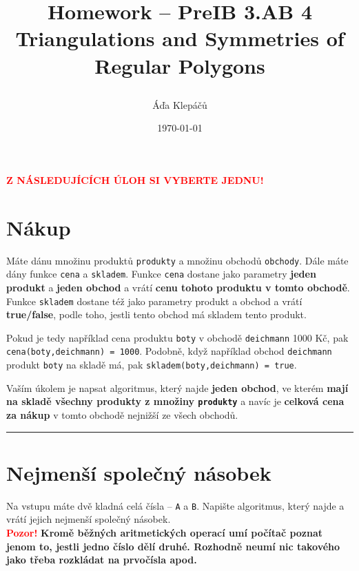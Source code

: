 \documentclass[a4paper,11pt]{article}
\title{\Huge\textsf{Homework -- PreIB 3.AB 4}\\
 \Large\textsf{Triangulations and Symmetries of Regular Polygons}
 \author{Áďa Klepáčů}
 \date{\today}
}
\newcommand{\clr}{\textcolor{red}}
\begin{document}
\thispagestyle{fancy}

\clr{\textbf{\uppercase{Z následujících úloh si vyberte jednu!}}}

\section*{Nákup}
Máte dánu množinu produktů \texttt{produkty} a množinu obchodů \texttt{obchody}.
Dále máte dány funkce \texttt{cena} a \texttt{skladem}. Funkce \texttt{cena}
dostane jako parametry \textbf{jeden produkt} a \textbf{jeden obchod} a vrátí
\textbf{cenu tohoto produktu v tomto obchodě}. Funkce \texttt{skladem} dostane
též jako parametry produkt a obchod a vrátí \textbf{true/false}, podle toho,
jestli tento obchod má skladem tento produkt.

Pokud je tedy například cena produktu \texttt{boty} v obchodě \texttt{deichmann}
1000 Kč, pak \texttt{cena(boty,deichmann) = 1000}. Podobně, když například
obchod \texttt{deichmann} produkt \texttt{boty} na skladě má, pak
\texttt{skladem(boty,deichmann) = true}.

Vaším úkolem je napsat algoritmus, který najde \textbf{jeden obchod}, ve kterém
\textbf{mají na skladě všechny produkty z množiny \texttt{produkty}} a navíc je
\textbf{celková cena za nákup} v tomto obchodě nejnižší ze všech obchodů.

\vspace*{2em}

\hrule

\section*{Nejmenší společný násobek}
Na vstupu máte dvě kladná celá čísla -- \texttt{A} a \texttt{B}. Napište
algoritmus, který najde a vrátí jejich nejmenší společný násobek.\\
\clr{\textbf{Pozor!}} \textbf{Kromě běžných aritmetických operací umí počítač
poznat jenom to, jestli jedno číslo dělí druhé. Rozhodně neumí nic takového jako
třeba rozkládat na prvočísla apod.}
\end{document}
